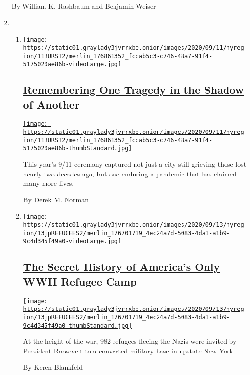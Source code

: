 \begin{enumerate}
  By William K. Rashbaum and Benjamin Weiser
\item
  \begin{enumerate}
  \def\labelenumii{\arabic{enumii}.}
  \item
    \texttt{[image: https://static01.graylady3jvrrxbe.onion/images/2020/09/11/nyregion/11BURST2/merlin\_176861352\_fccab5c3-c746-48a7-91f4-5175020ae86b-videoLarge.jpg]}

    \hypertarget{remembering-one-tragedy-in-the-shadow-of-another}{%
    \subsection{\texorpdfstring{\href{/interactive/2020/09/11/nyregion/9-11-ceremony-ground-zero.html}{Remembering
    One Tragedy in the Shadow of
    Another}}{Remembering One Tragedy in the Shadow of Another}}\label{remembering-one-tragedy-in-the-shadow-of-another}}

    \href{/interactive/2020/09/11/nyregion/9-11-ceremony-ground-zero.html}{\texttt{[image: https://static01.graylady3jvrrxbe.onion/images/2020/09/11/nyregion/11BURST2/merlin\_176861352\_fccab5c3-c746-48a7-91f4-5175020ae86b-thumbStandard.jpg]}}

    This year's 9/11 ceremony captured not just a city still grieving
    those lost nearly two decades ago, but one enduring a pandemic that
    has claimed many more lives.

    By Derek M. Norman
  \item
    \texttt{[image: https://static01.graylady3jvrrxbe.onion/images/2020/09/13/nyregion/13jpREFUGEES2/merlin\_176701719\_4ec24a7d-5083-4da1-a1b9-9c4d345f49a0-videoLarge.jpg]}

    \hypertarget{the-secret-history-of-americas-only-wwii-refugee-camp}{%
    \subsection{\texorpdfstring{\href{/2020/09/11/nyregion/oswego-jewish-refugees-world-war-two.html}{The
    Secret History of America's Only WWII Refugee
    Camp}}{The Secret History of America's Only WWII Refugee Camp}}\label{the-secret-history-of-americas-only-wwii-refugee-camp}}

    \href{/2020/09/11/nyregion/oswego-jewish-refugees-world-war-two.html}{\texttt{[image: https://static01.graylady3jvrrxbe.onion/images/2020/09/13/nyregion/13jpREFUGEES2/merlin\_176701719\_4ec24a7d-5083-4da1-a1b9-9c4d345f49a0-thumbStandard.jpg]}}

    At the height of the war, 982 refugees fleeing the Nazis were
    invited by President Roosevelt to a converted military base in
    upstate New York.

    By Keren Blankfeld
  \end{enumerate}
\end{enumerate}

